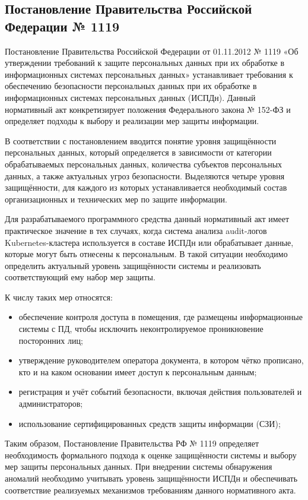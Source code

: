 \subsection{Постановление Правительства Российской Федерации № 1119}

Постановление Правительства Российской Федерации от 01.11.2012 № 1119 «Об утверждении требований к защите персональных данных при их обработке в информационных системах персональных данных» устанавливает требования к обеспечению безопасности персональных данных при их обработке в информационных системах персональных данных (ИСПДн). Данный нормативный акт конкретизирует положения Федерального закона № 152-ФЗ и определяет подходы к выбору и реализации мер защиты информации.

В соответствии с постановлением вводится понятие уровня защищённости персональных данных, который определяется в зависимости от категории обрабатываемых персональных данных, количества субъектов персональных данных, а также актуальных угроз безопасности. Выделяются четыре уровня защищённости, для каждого из которых устанавливается необходимый состав организационных и технических мер по защите информации.

Для разрабатываемого программного средства данный нормативный акт имеет практическое значение в тех случаях, когда система анализа audit-логов Kubernetes-кластера используется в составе ИСПДн или обрабатывает данные, которые могут быть отнесены к персональным. В такой ситуации необходимо определить актуальный уровень защищённости системы и реализовать соответствующий ему набор мер защиты.

К числу таких мер относятся:
\begin{itemize}
    \item обеспечение контроля доступа в помещения, где размещены информационные системы с ПД, чтобы исключить неконтролируемое проникновение посторонних лиц;
    \item утверждение руководителем оператора документа, в котором чётко прописано, кто и на каком основании имеет доступ к персональным данным;
    \item регистрация и учёт событий безопасности, включая действия пользователей и администраторов;
    \item использование сертифицированных средств защиты информации (СЗИ);
\end{itemize}

Таким образом, Постановление Правительства РФ № 1119 определяет необходимость формального подхода к оценке защищённости системы и выбору мер защиты персональных данных. При внедрении системы обнаружения аномалий необходимо учитывать уровень защищённости ИСПДн и обеспечивать соответствие реализуемых механизмов требованиям данного нормативного акта.